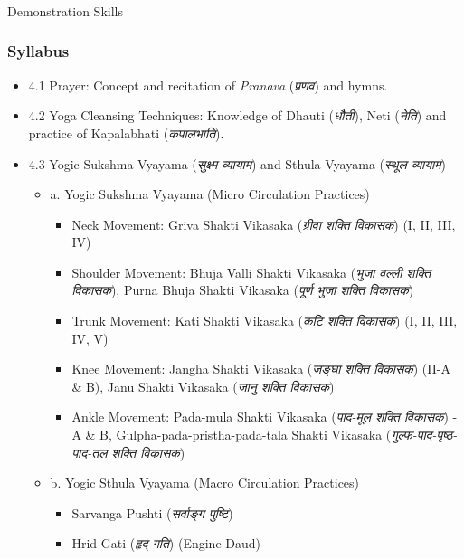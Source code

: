 \begin{frame}[fragile]\frametitle{}
\begin{center}
{\Large Demonstration Skills}
\end{center}
\end{frame}

\begin{frame}[fragile]\frametitle{Syllabus}

\begin{itemize}
\item 4.1  Prayer: Concept and recitation of \textit{Pranava} (\textit{प्रणव}) and hymns. 
\item 4.2  Yoga Cleansing Techniques: Knowledge of Dhauti (\textit{धौती}), Neti (\textit{नेति}) and practice of Kapalabhati (\textit{कपालभाति}). 
\item 4.3  Yogic Sukshma Vyayama (\textit{सुक्ष्म व्यायाम}) and Sthula Vyayama (\textit{स्थूल व्यायाम})      
	\begin{itemize}
	\item a. Yogic Sukshma Vyayama (Micro Circulation Practices) 
		\begin{itemize}
		\item Neck Movement: Griva Shakti Vikasaka (\textit{ग्रीवा शक्ति विकासक}) (I, II, III, IV) 
		\item Shoulder Movement: Bhuja Valli Shakti Vikasaka (\textit{भुजा वल्ली शक्ति विकासक}), Purna Bhuja Shakti Vikasaka (\textit{पूर्ण भुजा शक्ति विकासक}) 
		\item Trunk Movement: Kati Shakti Vikasaka (\textit{कटि शक्ति विकासक}) (I, II, III, IV, V) 
		\item Knee Movement: Jangha Shakti Vikasaka (\textit{जङ्घा शक्ति विकासक}) (II-A \& B), Janu Shakti Vikasaka (\textit{जानु शक्ति विकासक})
		\item Ankle Movement: Pada-mula Shakti Vikasaka (\textit{पाद-मूल शक्ति विकासक}) - A \& B, Gulpha-pada-pristha-pada-tala Shakti Vikasaka (\textit{गुल्फ-पाद-पृष्ठ-पाद-तल शक्ति विकासक})
		\end{itemize}
	\item b. Yogic Sthula Vyayama (Macro Circulation Practices) 
		\begin{itemize}
		\item Sarvanga Pushti (\textit{सर्वाङ्ग पुष्टि})
		\item Hrid Gati (\textit{हृद् गति}) (Engine Daud)
		\end{itemize}
	\end{itemize}
\end{itemize}
\end{frame}



